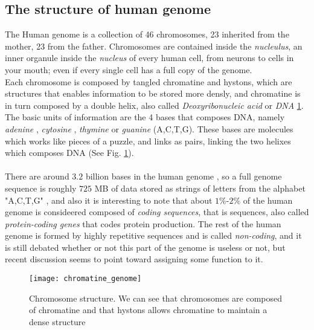\documentclass[12pt]{article}
\begin{document}
\subsection{The structure of human genome}
The Human genome is a collection of 46 chromosomes, 23 inherited from the mother, 23 from the father. Chromosomes are contained inside the \emph{nucleulus}, an inner organule inside the \emph{nucleus} of every human cell, from neurons to cells in your mouth; even if 
every single cell has a full copy of the genome. \\
Each chromosome is composed by tangled chromatine and hystons, which are structures that enables information to be stored more densly, and chromatine is in turn composed by a double helix, also called 
\emph{Deoxyribonucleic acid} or \emph{DNA} \ref{img:chromatin}.\\
The basic units of information are the 4 bases that composes DNA, namely \emph{adenine} , \emph{cytosine} , \emph{thymine} or \emph{guanine} (A,C,T,G)\cite{understanding_genetics}. These bases are molecules 
which works like pieces of a puzzle, and links as pairs, linking the two helixes which composes DNA (See Fig. \ref{img:chromatin}).\\
\\
There are around $3.2$ billion bases in the human genome \cite{understanding_genetics}, so a full genome sequence is roughly $725$ MB of data stored as strings of letters from the alphabet "A,C,T,G" \cite{genetic_data_misuse}, and 
also it is interesting to note that about $1\%$-$2\%$ of the human genome is consideered composed of \emph{coding sequences}, that is sequences, also called \emph{protein-coding genes} that codes protein production. The rest of the human genome 
is formed by highly repetitive sequences and is called \emph{non-coding}, and it is still debated whether or not this part of the genome is useless or not, but recent discussion seems to point toward assigning some function to it. \cite{non_coding}

\begin{figure}[H]
    \centering
    \texttt{[image: chromatine\_genome]}
    \caption{Chromosome structure. We can see that chromosomes are composed of chromatine and that hystons allows chromatine to maintain a dense structure}
    \label{img:chromatin}
\end{figure}
\end{document}
